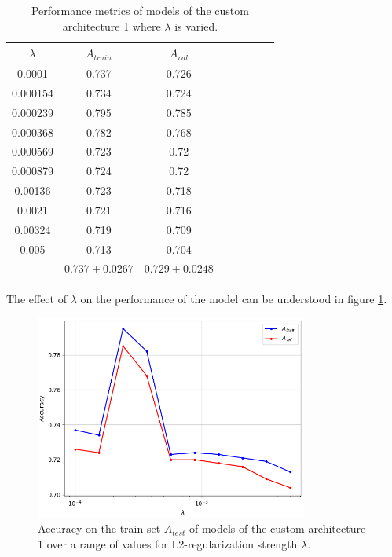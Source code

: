 \begin{table}[ht]
\centering
\begin{tabular}{ |c|c|c|c|c|c|c|c| }
\hline
$\lambda$ & $A_{train}$ & $A_{val}$ \\
\hline
0.0001 & 0.737 & 0.726 \\
0.000154 & 0.734 & 0.724 \\
0.000239 & 0.795 & 0.785 \\
0.000368 & 0.782 & 0.768 \\
0.000569 & 0.723 & 0.72 \\
0.000879 & 0.724 & 0.72 \\
0.00136 & 0.723 & 0.718 \\
0.0021 & 0.721 & 0.716 \\
0.00324 & 0.719 & 0.709 \\
0.005 & 0.713 & 0.704 \\
\hline
 & $0.737\pm0.0267$ & $0.729\pm0.0248$ \\
\hline
\end{tabular}
\caption{Performance metrics of models of the custom architecture 1 where $\lambda$ is varied.}
\label{table:custom1_all}
\end{table}

The effect of $\lambda$ on the performance of the model can be understood in figure \ref{fig:custom1_lambda}.

\begin{figure}[ht]
    \centering
    \includegraphics[width=0.8\textwidth]{figs/custom1_lambda.png}
    \caption{Accuracy on the train set $A_{test}$ of models of the custom architecture 1 over a range of values for L2-regularization strength $\lambda$.}
    \label{fig:custom1_lambda}
\end{figure}

